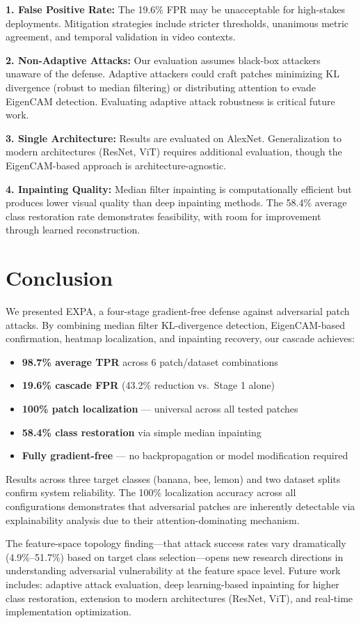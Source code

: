 \documentclass[conference]{IEEEtran}
\begin{document}
\textbf{1. False Positive Rate:} The 19.6\% FPR may be unacceptable for high-stakes deployments. Mitigation strategies include stricter thresholds, unanimous metric agreement, and temporal validation in video contexts.

\textbf{2. Non-Adaptive Attacks:} Our evaluation assumes black-box attackers unaware of the defense. Adaptive attackers could craft patches minimizing KL divergence (robust to median filtering) or distributing attention to evade EigenCAM detection. Evaluating adaptive attack robustness is critical future work.

\textbf{3. Single Architecture:} Results are evaluated on AlexNet. Generalization to modern architectures (ResNet, ViT) requires additional evaluation, though the EigenCAM-based approach is architecture-agnostic.

\textbf{4. Inpainting Quality:} Median filter inpainting is computationally efficient but produces lower visual quality than deep inpainting methods. The 58.4\% average class restoration rate demonstrates feasibility, with room for improvement through learned reconstruction.

\section{Conclusion}

We presented EXPA, a four-stage gradient-free defense against adversarial patch attacks. By combining median filter KL-divergence detection, EigenCAM-based confirmation, heatmap localization, and inpainting recovery, our cascade achieves:

\begin{itemize}
\item \textbf{98.7\% average TPR} across 6 patch/dataset combinations
\item \textbf{19.6\% cascade FPR} (43.2\% reduction vs.~Stage 1 alone)
\item \textbf{100\% patch localization} --- universal across all tested patches
\item \textbf{58.4\% class restoration} via simple median inpainting
\item \textbf{Fully gradient-free} --- no backpropagation or model modification required
\end{itemize}

Results across three target classes (banana, bee, lemon) and two dataset splits confirm system reliability. The 100\% localization accuracy across all configurations demonstrates that adversarial patches are inherently detectable via explainability analysis due to their attention-dominating mechanism.

The feature-space topology finding---that attack success rates vary dramatically (4.9\%--51.7\%) based on target class selection---opens new research directions in understanding adversarial vulnerability at the feature space level. Future work includes: adaptive attack evaluation, deep learning-based inpainting for higher class restoration, extension to modern architectures (ResNet, ViT), and real-time implementation optimization.



\end{document}
